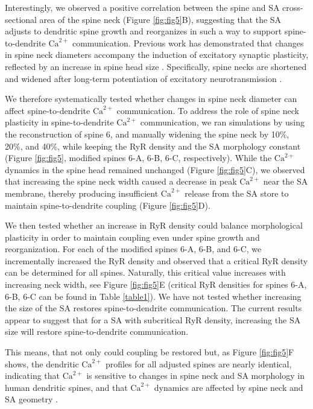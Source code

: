 \documentclass[12pt]{article}
\begin{document}
Interestingly, we observed a positive correlation between the spine and SA cross-sectional area of the spine neck (Figure \ref{fig:fig5}B), suggesting that the SA adjusts to dendritic spine growth and reorganizes in such a way to support spine-to-dendrite $\textrm{Ca}^{2+}$ communication. Previous work has demonstrated that changes in spine neck diameters accompany the induction of excitatory synaptic plasticity, reflected by an increase in spine head size \cite{Araya2014,Tonnesen2014,Steffens2021}. Specifically, spine necks are shortened and widened after long-term potentiation of excitatory neurotransmission \cite{Tonnesen2014}. 
		
We therefore systematically tested whether changes in spine neck diameter can affect spine-to-dendrite $\textrm{Ca}^{2+}$ communication. To address the role of spine neck plasticity in spine-to-dendrite $\textrm{Ca}^{2+}$ communication, we ran simulations by using the reconstruction of spine 6, and manually widening the spine neck by 10\%, 20\%, and 40\%, while keeping the RyR density and the SA morphology constant (Figure \ref{fig:fig5}, modified spines 6-A, 6-B, 6-C, respectively). While the $\textrm{Ca}^{2+}$ dynamics in the spine head remained unchanged (Figure \ref{fig:fig5}C), we observed that increasing the spine neck width caused a decrease in peak $\textrm{Ca}^{2+}$ near the SA membrane, thereby producing insufficient $\textrm{Ca}^{2+}$ release from the SA store to maintain spine-to-dendrite coupling (Figure \ref{fig:fig5}D). 
		
We then tested whether an increase in RyR density could balance morphological plasticity in order to maintain coupling even under spine growth and reorganization. For each of the modified spines 6-A, 6-B, and 6-C, we incrementally increased the RyR density and observed that a critical RyR density can be determined for all spines. Naturally, this critical value increases with increasing neck width, see Figure \ref{fig:fig5}E (critical RyR densities for spines 6-A, 6-B, 6-C can be found in Table \ref{table1}). We have not tested whether increasing the size of the SA restores spine-to-dendrite communication. The current results appear to suggest that for a SA with subcritical RyR density, increasing the SA size will restore spine-to-dendrite communication.
		
This means, that not only could coupling be restored but, as Figure \ref{fig:fig5}F shows, the dendritic $\textrm{Ca}^{2+}$ profiles for all adjusted spines are nearly identical, indicating that $\textrm{Ca}^{2+}$ is sensitive to changes in spine neck and SA morphology in human dendritic spines, and  that $\textrm{Ca}^{2+}$ dynamics are affected by spine neck and SA geometry \cite{Svoboda1996,Biess2007,Noguchi2005}.
\end{document}
